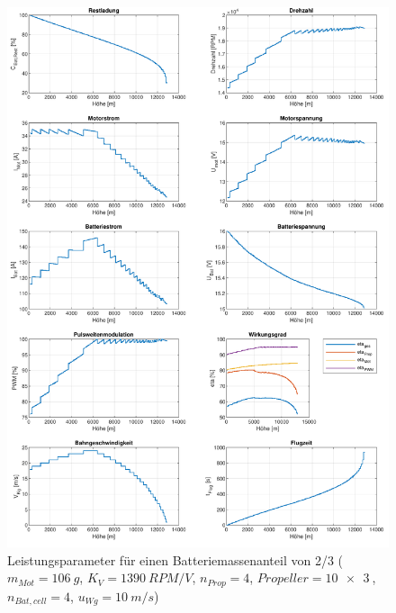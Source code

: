 \begin{appendix}
\begin{figure}[H]
\centering
	\includegraphics[scale=0.7]{Diagramme/Einfluss_eta_ges2.pdf}
	\caption{Leistungsparameter für einen Batteriemassenanteil von 2/3 (\ensuremath{m_{Mot}=\SI{106}{g}}, \ensuremath{K_V=\SI{1390}{RPM/V}}, \ensuremath{n_{Prop}=4}, \ensuremath{Propeller=\SI{10x3}{}}, \ensuremath{n_{Bat,cell}=4}, \ensuremath{u_{Wg}=\SI{10}{m/s}})}
	\label{abb:m_bat_eta_ges2/3}
\end{figure}





\end{appendix}
